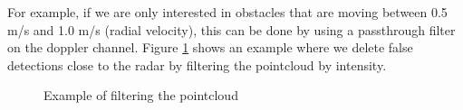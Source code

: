 \documentclass[12pt]{article}
\begin{document}
For example, if we are only interested in obstacles that are moving between 0.5 m/s and 1.0 m/s (radial velocity), this can be done by using a passthrough filter on the doppler channel.
Figure \ref{fig:filters} shows an example where we delete false detections close to the radar by filtering the pointcloud by intensity.
\begin{figure}[htb]%
    \centering
    \qquad
    \caption{Example of filtering the pointcloud}%
    \label{fig:filters}
\end{figure}

\end{document}
